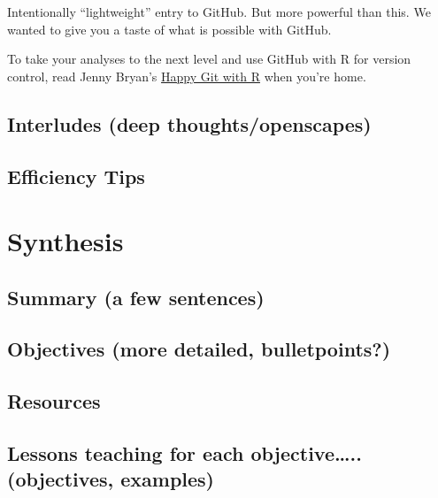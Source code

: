 \documentclass[]{book}
\begin{document}
Intentionally ``lightweight'' entry to GitHub. But more powerful than this. We wanted to give you a taste of what is possible with GitHub.

To take your analyses to the next level and use GitHub with R for version control, read Jenny Bryan's \href{https://happygitwithr.com/}{Happy Git with R} when you're home.

\hypertarget{interludes-deep-thoughtsopenscapes-5}{%
\section{Interludes (deep thoughts/openscapes)}\label{interludes-deep-thoughtsopenscapes-5}}

\hypertarget{efficiency-tips-6}{%
\section{Efficiency Tips}\label{efficiency-tips-6}}

\hypertarget{synthesis}{%
\chapter{Synthesis}\label{synthesis}}

\hypertarget{summary-a-few-sentences-5}{%
\section{Summary (a few sentences)}\label{summary-a-few-sentences-5}}

\hypertarget{objectives-more-detailed-bulletpoints-5}{%
\section{Objectives (more detailed, bulletpoints?)}\label{objectives-more-detailed-bulletpoints-5}}

\hypertarget{resources-7}{%
\section{Resources}\label{resources-7}}

\hypertarget{lessons-teaching-for-each-objective..-objectives-examples-1}{%
\section{Lessons teaching for each objective\ldots{}.. (objectives, examples)}\label{lessons-teaching-for-each-objective..-objectives-examples-1}}
\end{document}
